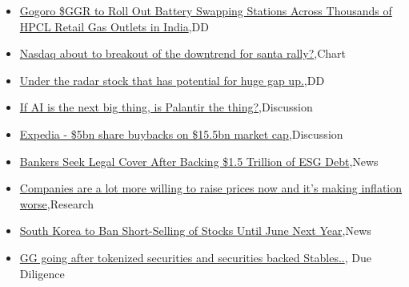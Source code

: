 \documentclass{article}%
\begin{document}
%
\begin{itemize}%
\item%
\href{https://reddit.com/r/wallstreetbets/comments/17p1s8s/gogoro\_ggr\_to\_roll\_out\_battery\_swapping\_stations/}{Gogoro \$GGR to Roll Out Battery Swapping Stations Across Thousands of HPCL Retail Gas Outlets in India},DD%
\item%
\href{https://reddit.com/r/wallstreetbets/comments/17p0e8n/nasdaq\_about\_to\_breakout\_of\_the\_downtrend\_for/}{Nasdaq about to breakout of the downtrend for santa rally?},Chart%
\item%
\href{https://reddit.com/r/wallstreetbets/comments/17oyei8/under\_the\_radar\_stock\_that\_has\_potential\_for\_huge/}{Under the radar stock that has potential for huge gap up.},DD%
\item%
\href{https://reddit.com/r/StockMarket/comments/17o72gm/if\_ai\_is\_the\_next\_big\_thing\_is\_palantir\_the\_thing/}{If AI is the next big thing, is Palantir the thing?},Discussion%
\item%
\href{https://reddit.com/r/StockMarket/comments/17o18sf/expedia\_5bn\_share\_buybacks\_on\_155bn\_market\_cap/}{Expedia - \$5bn share buybacks on \$15.5bn market cap},Discussion%
\item%
\href{https://reddit.com/r/Economics/comments/17oyoqo/bankers\_seek\_legal\_cover\_after\_backing\_15/}{Bankers Seek Legal Cover After Backing \$1.5 Trillion of ESG Debt},News%
\item%
\href{https://reddit.com/r/Economics/comments/17ogs98/companies\_are\_a\_lot\_more\_willing\_to\_raise\_prices/}{Companies are a lot more willing to raise prices now  and it's making inflation worse},Research%
\item%
\href{https://reddit.com/r/Economics/comments/17o7s9z/south\_korea\_to\_ban\_shortselling\_of\_stocks\_until/}{South Korea to Ban Short-Selling of Stocks Until June Next Year},News%
\item%
\href{https://reddit.com/r/Superstonk/comments/17ohbjy/gg\_going\_after\_tokenized\_securities\_and/}{GG going after tokenized securities and securities backed Stables..}, Due Diligence%
\end{itemize}%
\end{document}
